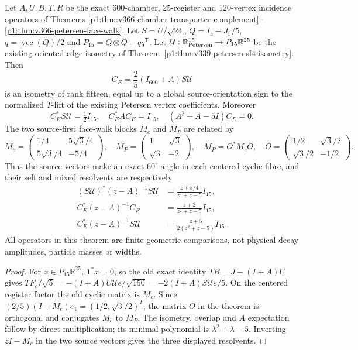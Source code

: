 \documentclass[11pt]{article}
\begin{document}
\begin{theorem}
\label{p1b:thm:v368-petersen-chamber-rotation}
Let $A,U,B,T,R$ be the exact 600-chamber, 25-register and
120-vertex incidence operators of Theorems
\ref{p1:thm:v366-chamber-transporter-complement}--
\ref{p1:thm:v366-petersen-face-walk}. Let
$S=U/\sqrt{24}$, $Q=I_5-J_5/5$,
$q=\operatorname{vec}(Q)/2$ and
$P_{15}=Q\otimes Q-qq^{\mathsf T}$. Let
$\mathcal U:\mathbb R^{15}_{\rm Petersen}\to P_{15}\mathbb R^{25}$
be the existing oriented edge isometry of
Theorem~\ref{p1:thm:v339-petersen-sl4-isometry}.
Then
\[
 C_E=\frac25(I_{600}+A)S\mathcal U
\]
is an isometry of rank fifteen, equal up to a global source-orientation
sign to the normalized $T$-lift of the existing Petersen vertex coefficients.
Moreover
\[
 C_E^*S\mathcal U=\tfrac12I_{15},\quad
 C_E^*AC_E=I_{15},\quad (A^2+A-5I)C_E=0.
\]
The two source-first face-walk blocks $M_c$ and $M_P$ are related by
\[
 M_c=\begin{pmatrix}1/4&5\sqrt3/4\\5\sqrt3/4&-5/4\end{pmatrix},\quad
 M_P=\begin{pmatrix}1&\sqrt3\\\sqrt3&-2\end{pmatrix},\quad
 M_P=O^*M_cO,\quad
 O=\begin{pmatrix}1/2&\sqrt3/2\\\sqrt3/2&-1/2\end{pmatrix}.
\]
Thus the source vectors make an exact $60^\circ$ angle in each
centered cyclic fibre, and their self and mixed resolvents are respectively
\[
\begin{aligned}
 (S\mathcal U)^*(z-A)^{-1}S\mathcal U&=\frac{z+5/4}{z^2+z-5}I_{15},\\
 C_E^*(z-A)^{-1}C_E&=\frac{z+2}{z^2+z-5}I_{15},\\
 C_E^*(z-A)^{-1}S\mathcal U&=\frac{z+5}{2(z^2+z-5)}I_{15}.
\end{aligned}
\]
All operators in this theorem are finite geometric comparisons, not
physical decay amplitudes, particle masses or widths.
\end{theorem}
\begin{proof}
For $x\in P_{15}\mathbb R^{25}$, $\mathbf1^*x=0$, so the
old exact identity $TB=J-(I+A)U$ gives
$TF_e/\sqrt5=-(I+A)U\mathcal Ue/\sqrt{150}
=-2(I+A)S\mathcal Ue/5$.
On the centered register factor the old cyclic matrix is $M_c$.
Since $(2/5)(I+M_c)e_1=(1/2,\sqrt3/2)^T$, the
matrix $O$ in the theorem is orthogonal and conjugates $M_c$ to $M_P$.
The isometry, overlap and $A$ expectation follow by direct
multiplication; its minimal polynomial is $\lambda^2+\lambda-5$.
Inverting $zI-M_c$ in the two source vectors gives the
three displayed resolvents.\end{proof}

\end{document}

